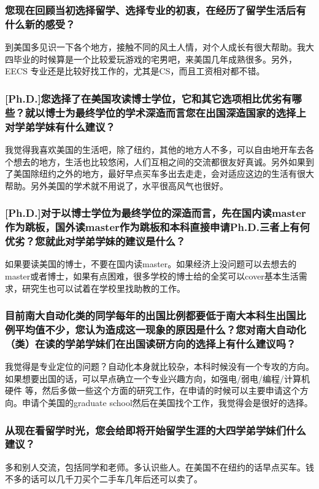 \documentclass[a4paper,UTF8]{book}
\begin{document}
    \subsubsection*{您现在回顾当初选择留学、选择专业的初衷，在经历了留学生活后有什么新的感受？}
    到美国多见识一下各个地方，接触不同的风土人情，对个人成长有很大帮助。我大四毕业的时候算是一个比较爱玩游戏的宅男吧，来美国几年成熟很多。另外，EECS 专业还是比较好找工作的，尤其是CS，而且工资相对都不错。
    
    \subsubsection*{[Ph.D.]您选择了在美国攻读博士学位，它和其它选项相比优劣有哪些？就以博士为最终学位的学术深造而言您在出国深造国家的选择上对学弟学妹有什么建议？}
    我觉得我喜欢美国的生活吧，除了纽约，其他的地方人不多，可以自由地开车去各个想去的地方，生活也比较悠闲，人们互相之间的交流都很友好真诚。另外如果到了美国除纽约之外的地方，最好早点买车多出去走走，会对适应这边的生活有很大帮助。另外美国的学术就不用说了，水平很高风气也很好。
    
    \subsubsection*{[Ph.D.]对于以博士学位为最终学位的深造而言，先在国内读master作为跳板，国外读master作为跳板和本科直接申请Ph.D.三者上有何优劣？您就此对学弟学妹的建议是什么？}
    如果要读美国的博士，不要在国内读master。如果经济上没问题可以去想去的master或者博士，如果有点困难，很多学校的博士给的全奖可以cover基本生活需求，研究生也可以试着在学校里找助教的工作。
    
    \subsubsection*{目前南大自动化类的同学每年的出国比例都要低于南大本科生出国比例平均值不少，您认为造成这一现象的原因是什么？您对南大自动化（类）在读的学弟学妹们在出国读研方向的选择上有什么建议吗？}
    我觉得是专业定位的问题？自动化本身就比较杂，本科时候没有一个专攻的方向。如果想要出国的话，可以早点确立一个专业兴趣方向，如强电/弱电/编程/计算机硬件 等，然后多做一些这个方面的研究工作，在申请的时候可以主要申请这个方向。申请个美国的graduate school然后在美国找个工作，我觉得会是很好的选择。
    
    \subsubsection*{从现在看留学时光，您会给即将开始留学生涯的大四学弟学妹们什么建议？}
    多和别人交流，包括同学和老师。多认识些人。在美国不在纽约的话早点买车。钱不多的话可以几千刀买个二手车几年后还可以卖了。
\end{document}

